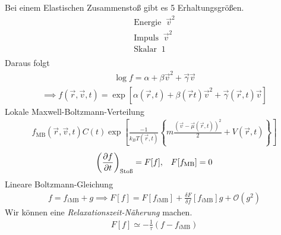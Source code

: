 Bei einem Elastischen Zusammenstoß gibt es 5 Erhaltungsgrößen.
%
\begin{align*}
  \text{Energie } ~ \vec{v}^2 \\
  \text{Impuls } ~ \vec{v}^2 \\
  \text{Skalar } ~ 1 \\
\end{align*}
%
Daraus folgt 
%
\begin{align*}
  \log{f} = \alpha + \beta \vec{v}^2 + \vec{\gamma} \vec{v}
\end{align*}
%
%
\begin{align*}
  \implies f(\vec{r}, \vec{v}, t) = \exp \left[ \alpha(\vec{r}, t) + \beta(\vec{r} t) \vec{v}^2 + \vec{\gamma}(\vec{r}, t) \vec{v} \right]
\end{align*}
%
Lokale Maxwell-Boltzmann-Verteilung
%
\begin{align*}
  f_\text{MB}(\vec{r}, \vec{v}, t) C(t) \exp \left[ \frac{-1}{k_B T(\vec{r}, t)}
  \left\{ m \frac{(\vec{v} - \vec{\mu}(\vec{r}, t))^2}{2} + V(\vec{r}, t) \right\} \right]
\end{align*}
%
%
\begin{align*}
  \left( \frac{\partial f }{\partial t} \right)_\text{Stoß} = F[f], && F[f_\text{MB}] = 0
\end{align*}
%
Lineare Boltzmann-Gleichung
%
\begin{align*}
  f = f_{i \text{MB}} + g \implies F[f] = F[f_{i \text{MB}}]
  + \frac{\delta F}{\delta f} [f _{i \text{MB}}] g + \mathcal{O}(g^2)
\end{align*}
%
Wir können eine \emph{Relaxationszeit-Näherung} machen.
%
\begin{align*}
  F[f] \simeq - \frac{1}{\tau} (f - f_{i \text{MB}})
\end{align*}
%
